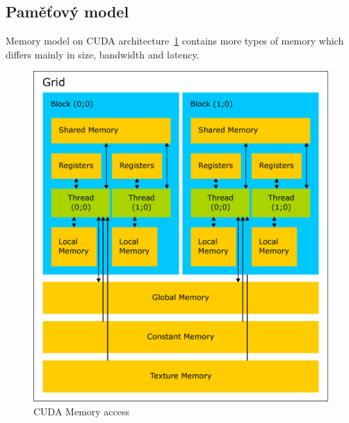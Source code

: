 \subsection{Paměťový model}

Memory model on CUDA architecture~\ref{fig:cudamemaccess} contains more types of memory which differs mainly in size, bandwidth and latency.

\begin{figure}[h]
  \centering
  \includegraphics[width=0.6\linewidth]{img/CUDAmemAccess.eps}
  \caption{CUDA Memory access}
  \label{fig:cudamemaccess}
\end{figure}


